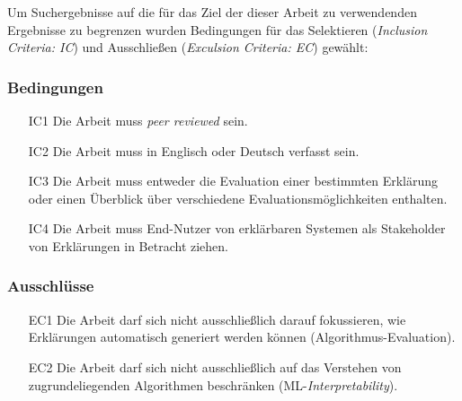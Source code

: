 Um Suchergebnisse auf die für das Ziel der dieser Arbeit zu verwendenden Ergebnisse zu begrenzen wurden Bedingungen für das Selektieren (\textit{Inclusion Criteria: IC}) und Ausschließen (\textit{Exculsion Criteria: EC}) gewählt:

\subsubsection{Bedingungen}

\begin{enumerate}
    \item[IC1] Die Arbeit muss \textit{peer reviewed} sein.
    \item[IC2] Die Arbeit muss in Englisch oder Deutsch verfasst sein.
    \item[IC3] Die Arbeit muss entweder die Evaluation einer bestimmten Erklärung oder einen Überblick über verschiedene Evaluationsmöglichkeiten enthalten.
    \item[IC4] Die Arbeit muss End-Nutzer von erklärbaren Systemen als Stakeholder von Erklärungen in Betracht ziehen.
\end{enumerate}

\subsubsection{Ausschlüsse}

\begin{enumerate}
    \item[EC1] Die Arbeit darf sich nicht ausschließlich darauf fokussieren, wie Erklärungen automatisch generiert werden können (Algorithmus-Evaluation).
    \item[EC2] Die Arbeit darf sich nicht ausschließlich auf das Verstehen von zugrundeliegenden Algorithmen beschränken (ML-\textit{Interpretability}).
\end{enumerate}
